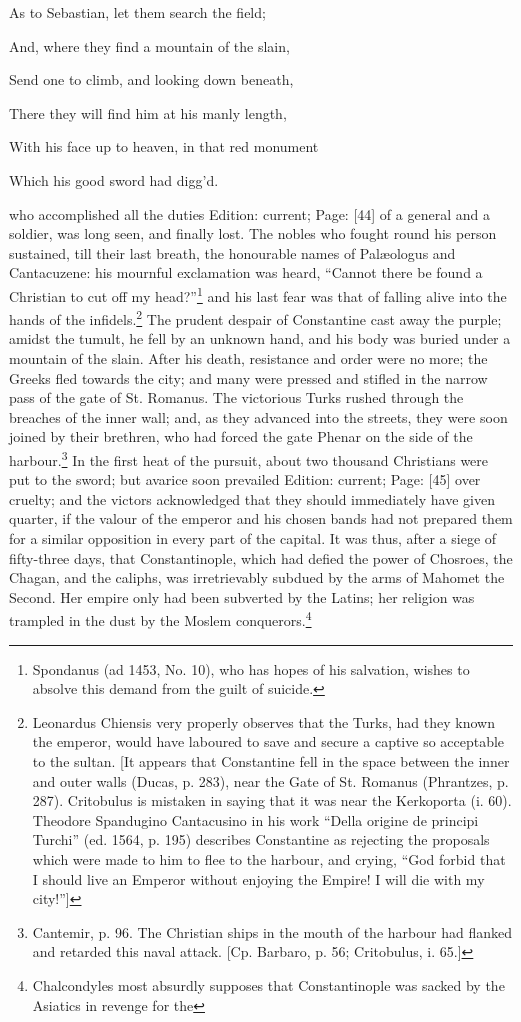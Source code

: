 {{}As to Sebastian, let them search the field;

And, where they find a mountain of the slain,

Send one to climb, and looking down beneath,

There they will find him at his manly length,

With his face up to heaven, in that red monument

Which his good sword had digg\texthebrew{}’d.} who accomplished all the duties Edition: current; Page: [44] of a general and a soldier, was long seen, and finally lost. The nobles who fought round his person sustained, till their last breath, the honourable names of Palæologus and Cantacuzene: his mournful exclamation was heard, \texthebrew{“}Cannot there be found a Christian to cut off my head?\texthebrew{}”\footnote{Spondanus (ad 1453, No. 10), who has hopes of his salvation, wishes to absolve this demand from the guilt of suicide.} and his last fear was that of falling alive into the hands of the infidels.\footnote{Leonardus Chiensis very properly observes that the Turks, had they known the emperor, would have laboured to save and secure a captive so acceptable to the sultan. [It appears that Constantine fell in the space between the inner and outer walls (Ducas, p. 283), near the Gate of St. Romanus (Phrantzes, p. 287). Critobulus is mistaken in saying that it was near the Kerkoporta (i. 60). Theodore Spandugino Cantacusino in his work \texthebrew{“}Della origine de principi Turchi\texthebrew{}” (ed. 1564, p. 195) describes Constantine as rejecting the proposals which were made to him to flee to the harbour, and crying, \texthebrew{“}God forbid that I should live an Emperor without enjoying the Empire! I will die with my city!\texthebrew{}”]} The prudent despair of Constantine cast away the purple; amidst the tumult, he fell by an unknown hand, and his body was buried under a mountain of the slain. After his death, resistance and order were no more; the Greeks fled towards the city; and many were pressed and stifled in the narrow pass of the gate of St. Romanus. The victorious Turks rushed through the breaches of the inner wall; and, as they advanced into the streets, they were soon joined by their brethren, who had forced the gate Phenar on the side of the harbour.\footnote{Cantemir, p. 96. The Christian ships in the mouth of the harbour had flanked and retarded this naval attack. [Cp. Barbaro, p. 56; Critobulus, i. 65.]} In the first heat of the pursuit, about two thousand Christians were put to the sword; but avarice soon prevailed Edition: current; Page: [45] over cruelty; and the victors acknowledged that they should immediately have given quarter, if the valour of the emperor and his chosen bands had not prepared them for a similar opposition in every part of the capital. It was thus, after a siege of fifty-three days, that Constantinople, which had defied the power of Chosroes, the Chagan, and the caliphs, was irretrievably subdued by the arms of Mahomet the Second. Her empire only had been subverted by the Latins; her religion was trampled in the dust by the Moslem conquerors.\footnote{Chalcondyles most absurdly supposes that Constantinople was sacked by the Asiatics in revenge for the }
